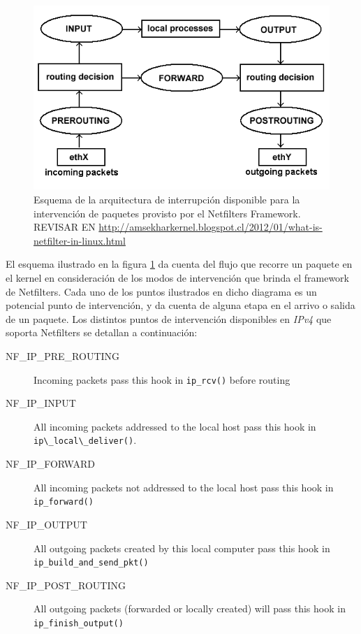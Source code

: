 \begin{figure}[!h]
	\centering
	\includegraphics[scale=.5]{imagenes/netfilterArchitecture}
	\caption{Esquema de la arquitectura de interrupción disponible para la intervención de paquetes provisto por el Netfilters Framework. REVISAR EN \url{http://amsekharkernel.blogspot.cl/2012/01/what-is-netfilter-in-linux.html}}
	\label{fig:netfilterArchitecture}
\end{figure}

El esquema ilustrado en la figura \ref{fig:netfilterArchitecture} da cuenta del flujo que recorre un paquete en el kernel en consideración de los modos de intervención que brinda el framework de Netfilters. Cada uno de los puntos ilustrados en dicho diagrama es un potencial punto de intervención, y da cuenta de alguna etapa en el arrivo o salida de un paquete. Los distintos puntos de intervención disponibles en \emph{IPv4} que soporta Netfilters se detallan a continuación:

\begin{description}
\item[NF\_IP\_PRE\_ROUTING] Incoming packets pass this hook in \verb=ip_rcv()= before routing
\item[NF\_IP\_INPUT] All incoming packets addressed to the local host pass this hook in \verb=ip\_local\_deliver()=.
\item[NF\_IP\_FORWARD] All incoming packets not addressed to the local host pass this hook in \verb=ip_forward()=
\item[NF\_IP\_OUTPUT] All outgoing packets created by this local computer pass this hook in \verb=ip_build_and_send_pkt()=
\item[NF\_IP\_POST\_ROUTING] All outgoing packets (forwarded or locally created) will pass this hook in \verb=ip_finish_output()=
\end{description}

